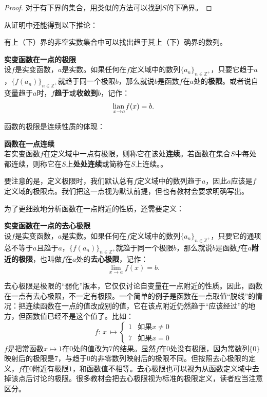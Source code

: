\documentclass[12pt,UTF8,fontset=none]{ctexbook}
\begin{document}
\begin{appendix}
\begin{proof}
    对于有下界的集合，用类似的方法可以找到$S$的下确界。

\end{proof}

从证明中还能得到以下推论：
\begin{tm}\label{tm:b-0-5}
    有上（下）界的非空实数集合中可以找出趋于其上（下）确界的数列。
\end{tm}

\begin{df}\textbf{实变函数在一点的极限}
    \mbox{}\\
    设$f$是实变函数，$a$是实数。如果任何在$f$定义域中的数列$\{a_n\}_{n\in\mathbb{Z}^+}$，只要它趋于$a$，$\{f(a_n)\}_{n\in\mathbb{Z}^+}$就趋于同一个极限$b$，那么就说$b$是函数$f$在$a$处的\textbf{极限}。或者说自变量趋于$a$时，$f$\textbf{趋于}或\textbf{收敛到}$b$，记作：
    $$  \underset{x \to a}{\operatorname{lian}\,} f(x) = b. $$
\end{df}
函数的极限是连续性质的体现：
\begin{df}{\textbf{函数在一点连续}}\\
    若实变函数$f$在定义域中一点有极限，则称它在该处\textbf{连续}。若函数在集合$S$中每处都连续，则称它在$S$上\textbf{处处连续}或简称在$S$上连续。。
\end{df}
要注意的是，定义极限时，我们默认总有$f$定义域中的数列趋于$a$，因此$a$应该是$f$定义域的极限点。我们把这一点视为默认前提，但也有教材会要求明确写出。

为了更细致地分析函数在一点附近的性质，还需要定义：
\begin{df}\textbf{实变函数在一点的去心极限}
    \mbox{}\\
    设$f$是实变函数，$a$是实数。如果任何在$f$定义域中的数列$\{a_n\}_{n\in\mathbb{Z}^+}$，只要它的通项总不等于$a$且趋于$a$，$\{f(a_n)\}_{n\in\mathbb{Z}^+}$就趋于同一个极限$b$，那么就说$b$是函数$f$在$a$\textbf{附近的极限}，也叫做$f$在$a$处的\textbf{去心极限}，记作：
    $$  \lim_{x \to a} f(x) = b. $$
\end{df}
去心极限是极限的“弱化”版本，它仅仅讨论自变量在一点附近的性质。因此，函数在一点有去心极限，不一定有极限。一个简单的例子是函数在一点取值“脱线”的情况：把连续函数在一点的值改成别的值，它在该点附近仍然趋于“应该经过”的地方，但函数值已经不是这个值了。比如：
$$
f: \, x\, \mapsto \begin{cases}
    1 & \mbox{如果}x \neq 0 \\
    7 & \mbox{如果}x = 0
\end{cases} 
$$
$f$是把常函数$x\mapsto 1$在$0$处的值改为$7$的结果。显然$f$在$0$处没有极限，因为常数列$\{0\}$映射后的极限是$7$，与趋于$0$的非零数列映射后的极限不同。但按照去心极限的定义，$f$在$0$附近有极限$1$，和函数值不相等。去心极限也可以视为从函数定义域中去掉该点后讨论的极限。很多教材会把去心极限视为标准的极限定义，读者应当注意区分。


\end{appendix}
\end{document}

